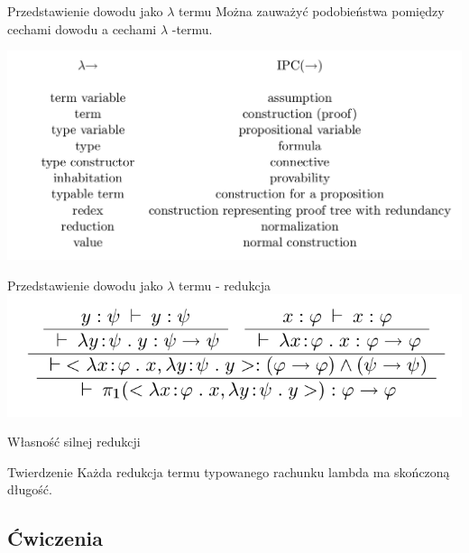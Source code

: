 \documentclass{beamer}
\begin{document}
\begin{frame}{Przedstawienie dowodu jako \(\lambda\) termu}
Można zauważyć podobieństwa pomiędzy cechami dowodu a cechami \(\lambda\) -termu.

\includegraphics[scale=0.25]{odpowiedniki_curry.png}
\end{frame}

\begin{frame}{Przedstawienie dowodu jako \(\lambda\) termu - redukcja}
\includegraphics[scale=0.25]{redex_curry.png}
\end{frame}

\begin{frame}{Własność silnej redukcji}
\begin{block}{Twierdzenie}
	Każda redukcja  termu typowanego rachunku lambda ma skończoną długość.

\end{block}
\end{frame}

\subsection{Ćwiczenia}
\end{document}
